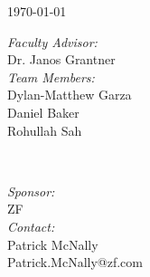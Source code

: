 \documentclass[12pt]{article}
\begin{document}
\begin{titlepage}
    {\large \today}\\[1cm] 
    
    
    \begin{minipage}{0.4\textwidth}
        \begin{flushleft} \large
            \emph{Faculty Advisor:}\\
            Dr. Janos Grantner\\ [.25cm]
        \emph{Team Members:}\\
        Dylan-Matthew Garza\\
        Daniel Baker\\
        Rohullah Sah
        \end{flushleft}
    \end{minipage}
    ~
    \begin{minipage}{0.4\textwidth}
        \begin{flushright} \large
            \emph{Sponsor:} \\
            ZF
            \\\emph{Contact:}\\
            Patrick McNally\\ 
            Patrick.McNally@zf.com
        \end{flushright}
    \end{minipage}\\[1cm]
    
    
    \begin{flushleft} \large
    \end{flushleft}
    
    \vfill 
    
\end{titlepage}
\tableofcontents
\newpage
\doublespacing
\end{document}

